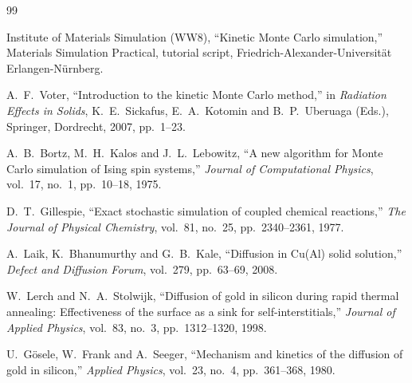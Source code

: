 \documentclass[11pt,a4paper]{article}
\numberwithin{equation}{section}
\theoremstyle{remark}
\begin{document}
\begin{thebibliography}{99}

Institute of Materials Simulation (WW8),
``Kinetic Monte Carlo simulation,''
Materials Simulation Practical, tutorial script,
Friedrich-Alexander-Universit\"at Erlangen-N\"urnberg.

A.~F.~Voter,
``Introduction to the kinetic Monte Carlo method,''
in \textit{Radiation Effects in Solids}, K.~E.~Sickafus, E.~A.~Kotomin and B.~P.~Uberuaga (Eds.),
Springer, Dordrecht, 2007, pp.~1--23.

A.~B.~Bortz, M.~H.~Kalos and J.~L.~Lebowitz,
``A new algorithm for Monte Carlo simulation of Ising spin systems,''
\textit{Journal of Computational Physics},
vol.~17, no.~1, pp.~10--18, 1975.

D.~T.~Gillespie,
``Exact stochastic simulation of coupled chemical reactions,''
\textit{The Journal of Physical Chemistry},
vol.~81, no.~25, pp.~2340--2361, 1977.

A.~Laik, K.~Bhanumurthy and G.~B.~Kale,
``Diffusion in Cu(Al) solid solution,''
\textit{Defect and Diffusion Forum},
vol.~279, pp.~63--69, 2008.

W.~Lerch and N.~A.~Stolwijk,
``Diffusion of gold in silicon during rapid thermal annealing: Effectiveness of the surface as a sink
for self-interstitials,''
\textit{Journal of Applied Physics},
vol.~83, no.~3, pp.~1312--1320, 1998.

U.~G\"osele, W.~Frank and A.~Seeger,
``Mechanism and kinetics of the diffusion of gold in silicon,''
\textit{Applied Physics},
vol.~23, no.~4, pp.~361--368, 1980.

\end{thebibliography}
\end{document}

